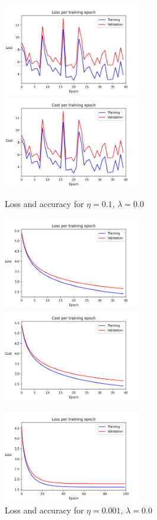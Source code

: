 \documentclass{article}
\begin{document}
\newpage

	\begin{figure}[h!]
		\centering
		\includegraphics[width=6cm]{../plots/loss_v1.png}
		\includegraphics[width=6cm]{../plots/cost_v1.png}
		\caption{Loss and accuracy for $\eta=0.1$, $\lambda=0.0$}
		\vspace{0.2cm}
		\includegraphics[width=6cm]{../plots/loss_v2.png}
		\includegraphics[width=6cm]{../plots/cost_v2.png}
		\caption{Loss and accuracy for $\eta=0.001$, $\lambda=0.0$}
		\vspace{0.2cm}
		\includegraphics[width=6cm]{../plots/loss_v3.png}

\end{figure}
\end{document}
